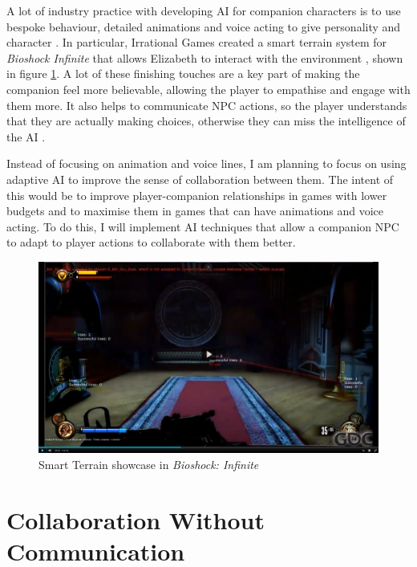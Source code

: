 \documentclass{IEEEtran}
\begin{document}
A lot of industry practice with developing AI for companion characters is to use bespoke behaviour, detailed animations and voice acting to give personality and character \cite{GAIP2EllieAI, GMTGoodAI, GAIPOReactions}. In particular, Irrational Games created a smart terrain system for \textit{Bioshock Infinite} that allows Elizabeth to interact with the environment \cite{GDCElizabeth, AIGamesBioshockAI}, shown in figure \ref{fig:BioshockSmartTerrain}. A lot of these finishing touches are a key part of making the companion feel more believable, allowing the player to empathise and engage with them more. It also helps to communicate NPC actions, so the player understands that they are actually making choices, otherwise they can miss the intelligence of the AI \cite{GMTGoodAI}.

Instead of focusing on animation and voice lines, I am planning to focus on using adaptive AI to improve the sense of collaboration between them. The intent of this would be to improve player-companion relationships in games with lower budgets and to maximise them in games that can have animations and voice acting. To do this, I will implement AI techniques that allow a companion NPC to adapt to player actions to collaborate with them better.

\begin{figure}
  \centering
  \includegraphics[width=\linewidth]{Images/BioshockSmartTerrain.png}
  
\caption{Smart Terrain showcase in \textit{Bioshock: Infinite}}
\label{fig:BioshockSmartTerrain}
\end{figure}

\section{Collaboration Without Communication}
\label{Communication}
\end{document}
